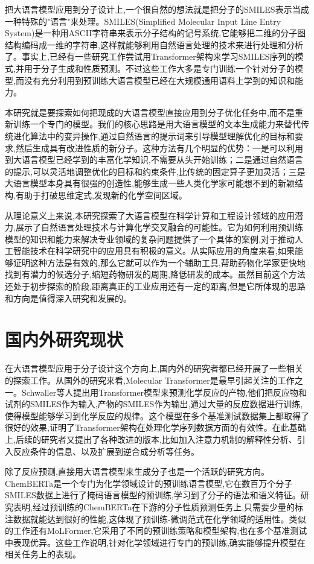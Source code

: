 把大语言模型应用到分子设计上,一个很自然的想法就是把分子的SMILES表示当成一种特殊的"语言"来处理。SMILES(Simplified Molecular Input Line Entry System)是一种用ASCII字符串来表示分子结构的记号系统,它能够把二维的分子图结构编码成一维的字符串,这样就能够利用自然语言处理的技术来进行处理和分析了。事实上,已经有一些研究工作尝试用Transformer架构来学习SMILES序列的模式,并用于分子生成和性质预测。不过这些工作大多是专门训练一个针对分子的模型,而没有充分利用到预训练大语言模型已经在大规模通用语料上学到的知识和能力。

本研究就是要探索如何把现成的大语言模型直接应用到分子优化任务中,而不是重新训练一个专门的模型。我们的核心思路是用大语言模型的文本生成能力来替代传统进化算法中的变异操作,通过自然语言的提示词来引导模型理解优化的目标和要求,然后生成具有改进性质的新分子。这种方法有几个明显的优势：一是可以利用到大语言模型已经学到的丰富化学知识,不需要从头开始训练；二是通过自然语言的提示,可以灵活地调整优化的目标和约束条件,比传统的固定算子更加灵活；三是大语言模型本身具有很强的创造性,能够生成一些人类化学家可能想不到的新颖结构,有助于打破思维定式,发现新的化学空间区域。

从理论意义上来说,本研究探索了大语言模型在科学计算和工程设计领域的应用潜力,展示了自然语言处理技术与计算化学交叉融合的可能性。它为如何利用预训练模型的知识和能力来解决专业领域的复杂问题提供了一个具体的案例,对于推动人工智能技术在科学研究中的应用具有积极的意义。从实际应用的角度来看,如果能够证明这种方法是有效的,那么它就可以作为一个辅助工具,帮助药物化学家更快地找到有潜力的候选分子,缩短药物研发的周期,降低研发的成本。虽然目前这个方法还处于初步探索的阶段,距离真正的工业应用还有一定的距离,但是它所体现的思路和方向是值得深入研究和发展的。

\section{国内外研究现状}

在大语言模型应用于分子设计这个方向上,国内外的研究者都已经开展了一些相关的探索工作。从国外的研究来看,Molecular Transformer是最早引起关注的工作之一。Schwaller等人提出用Transformer模型来预测化学反应的产物,他们把反应物和试剂的SMILES作为输入,产物的SMILES作为输出,通过大量的反应数据进行训练,使得模型能够学习到化学反应的规律。这个模型在多个基准测试数据集上都取得了很好的效果,证明了Transformer架构在处理化学序列数据方面的有效性。在此基础上,后续的研究者又提出了各种改进的版本,比如加入注意力机制的解释性分析、引入反应条件的信息、以及扩展到逆合成分析等任务。

除了反应预测,直接用大语言模型来生成分子也是一个活跃的研究方向。ChemBERTa是一个专门为化学领域设计的预训练语言模型,它在数百万个分子SMILES数据上进行了掩码语言模型的预训练,学习到了分子的语法和语义特征。研究表明,经过预训练的ChemBERTa在下游的分子性质预测任务上,只需要少量的标注数据就能达到很好的性能,这体现了预训练-微调范式在化学领域的适用性。类似的工作还有MoLFormer,它采用了不同的预训练策略和模型架构,也在多个基准测试中表现优异。这些工作说明,针对化学领域进行专门的预训练,确实能够提升模型在相关任务上的表现。

